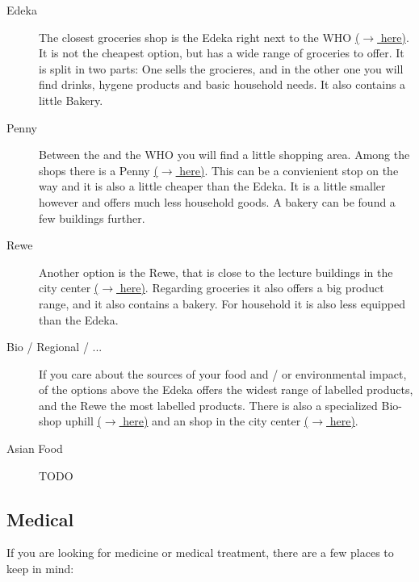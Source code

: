 \begin{description}
    \item[Edeka]
    The closest groceries shop is the Edeka right next to the WHO \href{https://maps.app.goo.gl/DTd9KutteiG8m5L1A}{($\xrightarrow{}$ here)}. It is not the cheapest option, but has a wide range of groceries to offer. It is split in two parts: One sells the grocieres, and in the other one you will find drinks, hygene products and basic household needs. It also contains a little Bakery.

    \item[Penny]
    Between the  and the WHO you will find a little shopping area. Among the shops there is a Penny \href{https://maps.app.goo.gl/7F1s1fUtsefv49gv8}{($\xrightarrow{}$ here)}. This can be a convienient stop on the way and it is also a little cheaper than the Edeka. It is a little smaller however and offers much less household goods. A bakery can be found a few buildings further.

    \item[Rewe]
    Another  option is the Rewe, that is close to the lecture buildings in the city center \href{https://maps.app.goo.gl/Sj6d82QsJSTaGCuv5}{($\xrightarrow{}$ here)}. Regarding groceries it also offers a big product range, and it also contains a bakery. For household it is also less equipped than the Edeka.

    \item[Bio / Regional / ...]
    If you care about the sources of your food and / or environmental impact, of the options above the Edeka offers the widest range of  labelled products, and the Rewe the most  labelled products. There is also a specialized Bio-shop uphill \href{https://maps.app.goo.gl/EEEsyTK1hGbJ5H1B6}{($\xrightarrow{}$ here)} and an  shop in the city center \href{https://maps.app.goo.gl/8ppTPAT6ZfP2TXeg6}{($\xrightarrow{}$ here)}.

    \item[Asian Food]
    {\color{darkred} TODO}
\end{description}

\subsection{Medical}
If you are looking for medicine or medical treatment, there are a few places to keep in mind:

